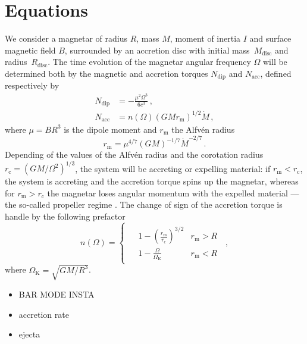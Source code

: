 \documentclass[11pt]{article} %
\newcommand{\tx}[1]{\textrm{#1}}
\newcommand{\Ndip}{\ensuremath{N_\tx{dip}}}
\newcommand{\Nacc}{\ensuremath{N_\tx{acc}}}
\newcommand{\alfvenradius}{\ensuremath{r_\tx{m}}}
\newcommand{\corotationradius}{\ensuremath{r_\tx{c}}}
\begin{document}
\section{Equations}

We consider a magnetar of radius $R$, mass $M$, moment of inertia $I$
and surface magnetic field $B$, surrounded by an accretion disc with
initial mass~$M_\tx{disc}$ and radius~$R_\tx{disc}$. The time
evolution of the magnetar angular frequency $\Omega$ will be
determined both by the magnetic and accretion torques \Ndip{} and
\Nacc{}, defined respectively by
\begin{align}
  \Ndip &= - \frac{\mu^2 \Omega^3}{6 c^3} \,,\\
  \Nacc &= n(\Omega) \left(G M \alfvenradius \right)^{1/2} \dot{M}
  \,,
\end{align}
where $\mu = B R^3$ is the dipole moment and \alfvenradius{} the
Alfvén radius
\begin{equation}
  \alfvenradius = \mu^{4/7} \left(GM\right)^{-1/7} \dot{M}^{-2/7}
  \,.
\end{equation}
Depending of the values of the Alfvén radius and the corotation
radius~$\corotationradius = \left(GM/\Omega^2\right)^{1/3}$, the
system will be accreting or expelling material: if $\alfvenradius <
\corotationradius$, the system is accreting and the accretion torque
spins up the magnetar, whereas for $\alfvenradius > \corotationradius$
the magnetar loses angular momentum with the expelled material --- the
so-called propeller regime \citep{gompertz2014}. The change of sign of
the accretion torque is handle by the following prefactor
\begin{equation}
  n(\Omega) =
  \begin{cases}
    \begin{aligned}
      &1 - \left(\frac{\alfvenradius}{\corotationradius}\right)^{3/2}  &\alfvenradius> R\\
      &1 - \frac{\Omega}{\Omega_\tx{K}}  &\alfvenradius < R
    \end{aligned}
  \end{cases}
  \,,
\end{equation}
where $\Omega_\tx{K}=\sqrt{GM/R^3}$.

\begin{itemize}
\item BAR MODE INSTA
\item accretion rate
\item ejecta
\end{itemize}
\end{document}

